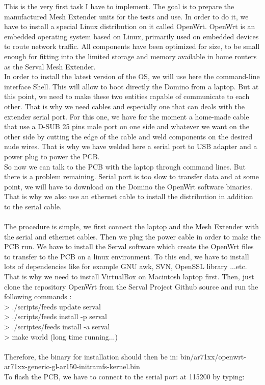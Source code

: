 This is the very first task I have to implement. The goal is to prepare the manufactured Mesh Extender units for the tests and use. In order to do it, we have to install a special Linux distribution on it called OpenWrt. OpenWrt is an embedded operating system based on Linux, primarily used on embedded devices to route network traffic. All components have been optimized for size, to be small enough for fitting into the limited storage and memory available in home routers as the Serval Mesh Extender. \\
In order to install the latest version of the OS, we will use here the command-line interface Shell. This will allow to boot directly the Domino from a laptop. But at this point, we need to make these two entities capable of communicate to each other. That is why we need cables and especially one that can deals with the extender serial port. For this one, we have for the moment a home-made cable that use a D-SUB 25 pins male port on one side and whatever we want on the other side by cutting the edge of the cable and weld components on the desired nude wires. That is why we have welded here a serial port to USB adapter and a power plug to power the PCB. \\
So now we can talk to the PCB with the laptop through command lines. But there is a problem remaining. Serial port is too slow to transfer data and at some point, we will have to download on the Domino the OpenWrt software binaries. That is why we also use an ethernet cable to install the distribution in addition to the serial cable. \\ \\ 
The procedure is simple, we first connect the laptop and the Mesh Extender with the serial and ethernet cables. Then we plug the power cable in order to make the PCB run. We have to install the Serval software which create the OpenWrt files to transfer to the PCB on a linux environment. To this end, we have to install lots of dependencies like for example GNU awk, SVN, OpenSSL library ...etc. That is why we need to install VirtualBox on Macintosh laptop first. Then, just clone the repository OpenWrt from the Serval Project Github source and run the following commands :\\
> ./scripts/feeds update serval\\
> ./scripts/feeds install -p serval\\
> ./scriptes/feeds install -a serval\\
> make world (long time running...)\\ \\
Therefore, the binary for installation should then be in: bin/ar71xx/openwrt-ar71xx-generic-gl-ar150-initramfs-kernel.bin \\
To flash the PCB, we have to connect to the serial port at 115200 by typing:\\

